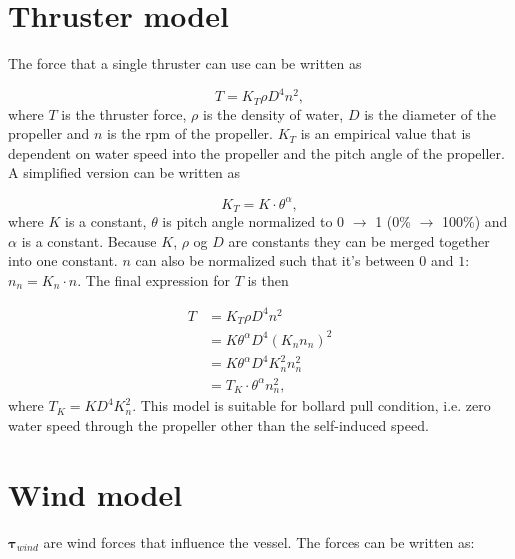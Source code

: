 \documentclass[a4paper]{article}
\begin{document}
\section{Thruster model}

The force that a single thruster can use can be written as

\begin{equation}
	T = K_T \rho D^4 n^2,
\end{equation}
%
where $T$ is the thruster force, $\rho$ is the density of water, $D$ is the diameter of the propeller and $n$ is the rpm of the propeller. $K_T$ is an empirical value that is
dependent on water speed into the propeller and the pitch angle of the propeller. A simplified version can be written as

\begin{equation}
	K_T = K \cdot \theta^\alpha,
\end{equation}
%
where $K$ is a constant, $\theta$ is pitch angle normalized to 0 $\rightarrow$ 1 (0\% $\rightarrow$ 100\%) and $\alpha$ is a constant. Because $K$, $\rho$ og $D$ are constants
they can be merged together into one constant. $n$ can also be normalized such that it's between $0$ and $1$: $n_n = K_n \cdot n$. The final expression for $T$ is then

\begin{equation}
\begin{aligned}
	T &= K_T \rho D^4 n^2 \\
	   &= K \theta^\alpha D^4 (K_n n_n)^2 \\
	   &= K \theta^\alpha D^4 K_n^2 n_n^2 \\
	   &= T_{K} \cdot \theta^\alpha n_n^2,
\end{aligned}
\end{equation}
%
where $T_{K} = K D^4 K_n^2$.
%
This model is suitable for bollard pull condition, i.e. zero water speed through the propeller other than the self-induced speed.

\section{Wind model}

$\boldsymbol{\tau}_{wind}$  are wind forces that influence the vessel. The forces can be written as:
\end{document}
